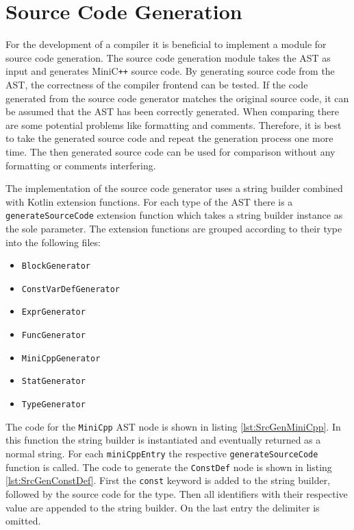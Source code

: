 \section{Source Code Generation}

For the development of a compiler it is beneficial to implement a module for source code generation. The source code generation module takes the AST as input and generates MiniC\verb|++| source code. By generating source code from the AST, the correctness of the compiler frontend can be tested. If the code generated from the source code generator matches the original source code, it can be assumed that the AST has been correctly generated. When comparing there are some potential problems like formatting and comments. Therefore, it is best to take the generated source code and repeat the generation process one more time. The then generated source code can be used for comparison without any formatting or comments interfering. 

The implementation of the source code generator uses a string builder combined with Kotlin extension functions. For each type of the AST there is a \verb|generateSourceCode| extension function which takes a string builder instance as the sole parameter. The extension functions are grouped according to their type into the following files:

\begin{itemize}
    \item \verb|BlockGenerator|
    \item \verb|ConstVarDefGenerator|
    \item \verb|ExprGenerator|
    \item \verb|FuncGenerator|
    \item \verb|MiniCppGenerator|
    \item \verb|StatGenerator|
    \item \verb|TypeGenerator|
\end{itemize}

The code for the \verb|MiniCpp| AST node is shown in listing \ref{lst:SrcGenMiniCpp}. In this function the string builder is instantiated and eventually returned as a normal string. For each \verb|miniCppEntry| the respective \verb|generateSourceCode| function is called. The code to generate the \verb|ConstDef| node is shown in listing \ref{lst:SrcGenConstDef}. First the \verb|const| keyword is added to the string builder, followed by the source code for the type. Then all identifiers with their respective value are appended to the string builder. On the last entry the delimiter is omitted. 


